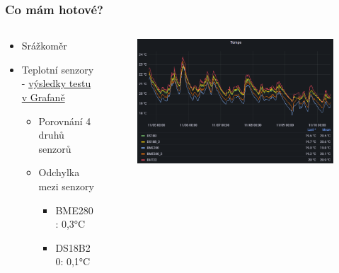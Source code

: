 \documentclass[%
  12pt,       				%
	t,                  %
	aspectratio=1610,   %
	unicode,						%
]{beamer}				    	%
\begin{document}
\disablenavigationsymbols

\maketitle


\begin{frame} 
	\frametitle{Co mám hotové?}
    \begin{columns}[T] 								%
		\begin{column}{0.4\textwidth}		%
			\begin{itemize}
			\item Srážkoměr
            \item Teplotní senzory - \href{http://89.221.217.87:3000/d/qllPEGDVz/temptest?orgId=1}{výsledky testu v Grafaně}
                \begin{itemize}
					\item Porovnání 4 druhů senzorů
					\item Odchylka mezi senzory
                        \begin{itemize}
					   \item BME280: 0,3°C
					   \item DS18B20: 0,1°C 
				        \end{itemize}
				\end{itemize}
            
	   \end{itemize}
		\end{column}
		\begin{column}{0.6\textwidth}		%
			\begin{figure}%
				\centering
				\vspace{0.5cm}	              %
				\includegraphics[width=1\columnwidth]{obrazky/prezentace/Temps}
			\end{figure}
		\end{column}
	\end{columns}		
\end{frame} 
\end{document}
